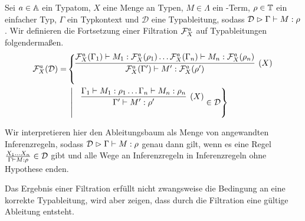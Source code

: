 \begin{definition}{}{}
    Sei $a\in\At$ ein Typatom, $X$ eine Menge an Typen, $M\in\Lambda$ ein \tlambda-Term, $\rho\in\T$ ein einfacher Typ, $\Gamma$ ein Typkontext und $\mathcal{D}$ eine Typableitung, sodass $\mathcal{D}\judges\Gamma\vdash M : \rho$. Wir definieren die Fortsetzung einer Filtration $\F^a_X$ auf Typableitungen folgendermaßen. 
    \begin{align*}
    \F^a_X(\mathcal{D}) = &\left\{
    \infer[(X)]{\F^a_X(\Gamma')\vdash M' :\F^a_X(\rho')}
    {\F^a_X(\Gamma_1)\vdash M_1 : \F^a_X(\rho_1)\ldots \F^a_X(\Gamma_n)\vdash M_n : \F^a_X(\rho_n)} \right.\\ &\;\left|\quad \infer[(X)]{\Gamma'\vdash M':\rho'}{\Gamma_1\vdash M_1 : \rho_1 \ldots \Gamma_n\vdash M_n : \rho_n} \in\mathcal{D}
    \right\}
    \end{align*}
\end{definition}             
\begin{remark}
    Wir interpretieren hier den Ableitungsbaum als Menge von angewandten Inferenzregeln, sodass $\mathcal{D}\judges \Gamma\vdash M:\rho$ genau dann gilt, wenn es eine Regel $\revfrac{\Gamma\vdash M:\rho}{X_1\ldots X_n}\in\mathcal{D}$ gibt und alle Wege an Inferenzregeln in Inferenzregeln ohne Hypothese enden.
    
    Das Ergebnis einer Filtration erfüllt nicht zwangsweise die Bedingung an eine korrekte Typableitung,  wird aber zeigen, dass durch die Filtration eine gültige Ableitung entsteht.
\end{remark}


